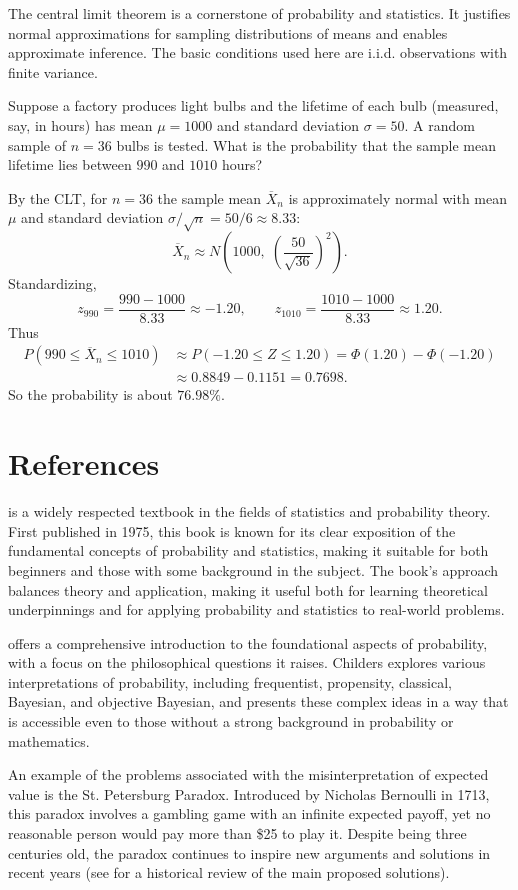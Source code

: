 The central limit theorem is a cornerstone of probability and statistics. It justifies normal approximations for sampling distributions of means and enables approximate inference. The basic conditions used here are i.i.d. observations with finite variance. 

\begin{example}
Suppose a factory produces light bulbs and the lifetime of each bulb (measured, say, in hours) has mean $\mu=1000$ and standard deviation $\sigma=50$. A random sample of $n=36$ bulbs is tested. What is the probability that the sample mean lifetime lies between $990$ and $1010$ hours?

By the CLT, for $n=36$ the sample mean $\overline{X}_n$ is approximately normal with mean $\mu$ and standard deviation $\sigma/\sqrt{n}=50/6\approx 8.33$:
\[
\overline{X}_n \approx N\!\left(1000,\;\left(\frac{50}{\sqrt{36}}\right)^2\right).
\]
Standardizing,
\[
z_{990}=\frac{990-1000}{8.33}\approx -1.20,
\qquad
z_{1010}=\frac{1010-1000}{8.33}\approx 1.20.
\]
Thus
\begin{equation*}
\begin{split}
P(990 \le \overline{X}_n \le 1010)
& \approx P(-1.20 \le Z \le 1.20)
= \Phi(1.20)-\Phi(-1.20) \\
& \approx 0.8849-0.1151
= 0.7698.
\end{split}  
\end{equation*}
So the probability is about $76.98\%$.
\end{example}

%
%
\section*{References}

\cite{degroot1986probability} is a widely respected textbook in the fields of statistics and probability theory. First published in 1975, this book is known for its clear exposition of the fundamental concepts of probability and statistics, making it suitable for both beginners and those with some background in the subject. The book's approach balances theory and application, making it useful both for learning theoretical underpinnings and for applying probability and statistics to real-world problems.

\cite{childers2013philosophy} offers a comprehensive introduction to the foundational aspects of probability, with a focus on the philosophical questions it raises. Childers explores various interpretations of probability, including frequentist, propensity, classical, Bayesian, and objective Bayesian, and presents these complex ideas in a way that is accessible even to those without a strong background in probability or mathematics.

An example of the problems associated with the misinterpretation of expected value is the St. Petersburg Paradox. Introduced by Nicholas Bernoulli in 1713, this paradox involves a gambling game with an infinite expected payoff, yet no reasonable person would pay more than \$25 to play it. Despite being three centuries old, the paradox continues to inspire new arguments and solutions in recent years (see \cite{huang2013three} for a historical review of the main proposed solutions).
